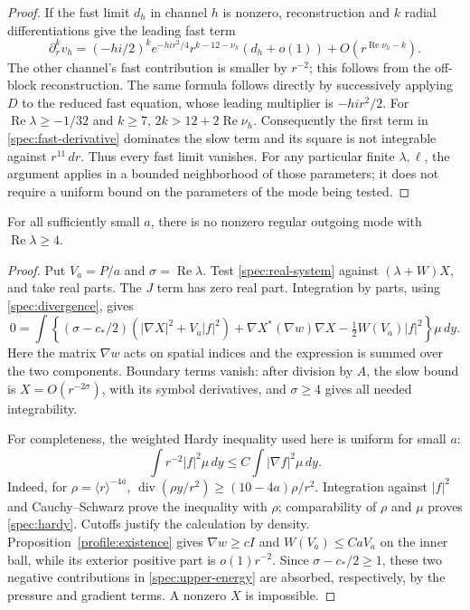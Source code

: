 \begin{proof}
If the fast limit $d_h$ in channel $h$ is nonzero, reconstruction and
$k$ radial differentiations give the leading fast term
\begin{equation}\label{spec:fast-derivative}
 \partial_r^k v_h=
 (-hi/2)^k e^{-hi r^2/4}r^{k-12-\nu_h}(d_h+o(1))
 +O(r^{\operatorname{Re}\nu_h-k}).
\end{equation}
The other channel's fast contribution is smaller by $r^{-2}$; this
follows from the off-block reconstruction. The same formula follows
directly by successively applying $D$ to the reduced fast equation,
whose leading multiplier is $-hi r^2/2$.
For $\operatorname{Re}\lambda\ge-1/32$ and $k\ge7$,
$2k>12+2\operatorname{Re}\nu_h$. Consequently the first term in
\eqref{spec:fast-derivative} dominates the slow term and its square is
not integrable against $r^{11}\,dr$. Thus every fast limit vanishes.
For any particular finite $\lambda,\ell$, the argument applies in a
bounded neighborhood of those parameters; it does not require a
uniform bound on the parameters of the mode being tested.
\end{proof}

\begin{lemma}\label{spec:real-bound}
For all sufficiently small $a$, there is no nonzero regular outgoing
mode with $\operatorname{Re}\lambda\ge4$.
\end{lemma}

\begin{proof}
Put $V_a=P/a$ and $\sigma=\operatorname{Re}\lambda$. Test
\eqref{spec:real-system} against $(\lambda+W)X$, and take real parts.
The $J$ term has zero real part. Integration by parts, using
\eqref{spec:divergence}, gives
\begin{equation}\label{spec:upper-energy}
 0=\int\left\{(\sigma-c_*/2)(|\nabla X|^2+V_a|f|^2)
 +\nabla X^*(\nabla w)\nabla X
 -\tfrac12 W(V_a)|f|^2\right\}\mu\,dy.
\end{equation}
Here the matrix $\nabla w$ acts on spatial indices and the expression
is summed over the two components. Boundary terms vanish: after
division by $A$, the slow bound is $X=O(r^{-2\sigma})$, with its symbol
derivatives, and $\sigma\ge4$ gives all needed integrability.

For completeness, the weighted Hardy inequality used here is uniform
for small $a$:
\begin{equation}\label{spec:hardy}
 \int r^{-2}|f|^2\mu\,dy\le C\int|\nabla f|^2\mu\,dy.
\end{equation}
Indeed, for $\rho=\langle r\rangle^{-4a}$,
$\operatorname{div}(\rho y/r^2)\ge(10-4a)\rho/r^2$.
Integration against $|f|^2$ and Cauchy--Schwarz prove the inequality
with $\rho$; comparability of $\rho$ and $\mu$ proves
\eqref{spec:hardy}. Cutoffs justify the calculation by density.
Proposition~\ref{profile:existence} gives $\nabla w\ge cI$ and
$W(V_a)\le C a V_a$ on the inner ball, while its exterior positive
part is $o(1)r^{-2}$. Since $\sigma-c_*/2\ge1$, these two negative
contributions in \eqref{spec:upper-energy} are absorbed, respectively,
by the pressure and gradient terms. A nonzero $X$ is impossible.
\end{proof}

